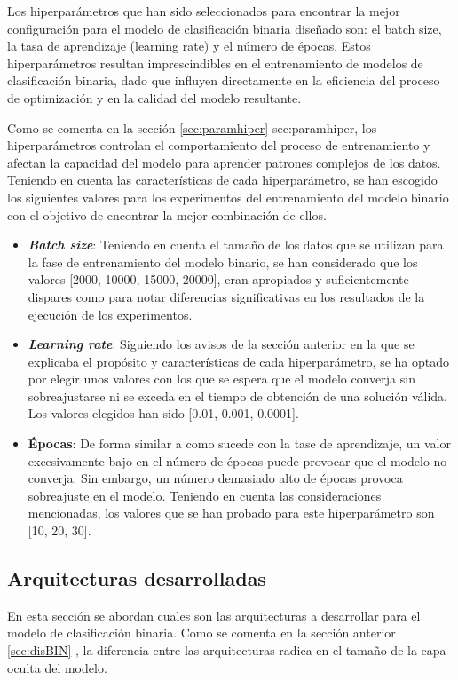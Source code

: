 Los hiperparámetros que han sido seleccionados para encontrar la mejor configuración para el modelo de clasificación binaria diseñado son: el batch size, la tasa de aprendizaje (learning rate) y el número de épocas. Estos hiperparámetros resultan imprescindibles en el entrenamiento de modelos de clasificación binaria, dado que influyen directamente en la eficiencia del proceso de optimización y en la calidad del modelo resultante.

Como se comenta en la sección \ref{sec:paramhiper} \refname{sec:paramhiper}, los hiperparámetros controlan el comportamiento del proceso de entrenamiento y afectan la capacidad del modelo para aprender patrones complejos de los datos. Teniendo en cuenta las características de cada hiperparámetro, se han escogido los siguientes valores para los experimentos del entrenamiento del modelo binario con el objetivo de encontrar la mejor combinación de ellos.

\begin{itemize}
	\item \textbf{\textit{Batch size}}: Teniendo en cuenta el tamaño de los datos que se utilizan para la fase de entrenamiento del modelo binario, se han considerado que los valores [2000, 10000, 15000, 20000], eran apropiados y suficientemente dispares como para notar diferencias significativas en los resultados de la ejecución de los experimentos.
	\item \textbf{\textit{Learning rate}}: Siguiendo los avisos de la sección anterior en la que se explicaba el propósito y características de cada hiperparámetro, se ha optado por elegir unos valores con los que se espera que el modelo converja sin sobreajustarse ni se exceda en el tiempo de obtención de una solución válida. Los valores elegidos han sido [0.01, 0.001, 0.0001].
	\item \textbf{Épocas}: De forma similar a como sucede con la tase de aprendizaje, un valor excesivamente bajo en el número de épocas puede provocar que el modelo no converja. Sin embargo, un número demasiado alto de épocas provoca sobreajuste en el modelo. Teniendo en cuenta las consideraciones mencionadas, los valores que se han probado para este hiperparámetro son [10, 20, 30].
\end{itemize}

\subsection{Arquitecturas desarrolladas}
En esta sección se abordan cuales son las arquitecturas a desarrollar para el modelo de clasificación binaria. Como se comenta en la sección anterior \ref{sec:disBIN} , la diferencia entre las arquitecturas radica en el tamaño de la capa oculta del modelo.

